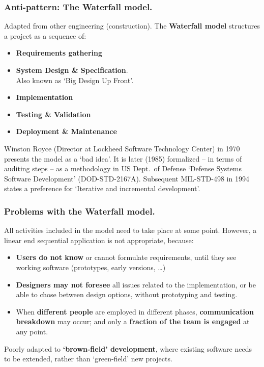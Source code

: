 \documentclass{beamer} %
\newcommand\emc[1]{\textcolor{midred}{\textbf{#1}}}
\begin{document}
\begin{frame}
\frametitle{Anti-pattern: The Waterfall model.}

Adapted from other engineering (construction). The \emc{Waterfall model} structures a project as a sequence of:
\begin{itemize}
\item \emc{Requirements gathering}
\item \emc{System Design \& Specification}. \\ Also known as `Big Design Up Front'.
\item \emc{Implementation}
\item \emc{Testing \& Validation}
\item \emc{Deployment \& Maintenance}
\end{itemize}

\begin{block}{}
\small Winston Royce (Director at Lockheed Software Technology Center) in 1970 presents the model as a `bad idea'. It is later (1985) formalized -- in terms of auditing steps -- as a methodology in US Dept.\ of Defense `Defense Systems Software Development' (DOD-STD-2167A). Subsequent MIL-STD-498 in 1994 states a preference for `Iterative and incremental development'.
\end{block}

\end{frame}

\begin{frame}
\frametitle{Problems with the Waterfall model.}

All activities included in the model need to take place at some point. However, a linear end sequential application is not appropriate, because:
\begin{itemize}
  \item \emc{Users do not know} or cannot formulate requirements, until they see working software (prototypes, early versions, \ldots)
  \item \emc{Designers may not foresee} all issues related to the implementation, or be able to chose between design options, without prototyping and testing.
  \item When \emc{different people} are employed in different phases, \emc{communication breakdown} may occur; and only a \emc{fraction of the team is engaged} at any point.
\end{itemize}

Poorly adapted to \emc{`brown-field' development}, where existing software needs to be extended, rather than `green-field' new projects.

\end{frame}
\end{document}
